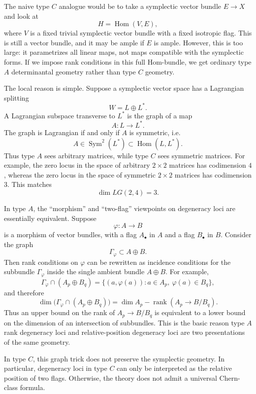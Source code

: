 \documentclass[12pt]{article}
\begin{document}
The naive type $C$ analogue would be to take a symplectic vector bundle $E\to X$ and look at
\[
    H=\operatorname{Hom}(V,E),
\]
where $V$ is a fixed trivial symplectic vector bundle with a fixed isotropic flag. This is still a vector bundle, and it may be ample if $E$ is ample. However, this is too large: it parametrizes all linear maps, not maps compatible with the symplectic forms. If we impose rank conditions in this full Hom-bundle, we get ordinary type $A$ determinantal geometry rather than type $C$ geometry.

The local reason is simple. Suppose a symplectic vector space has a Lagrangian splitting
\[
    W=L\oplus L^*.
\]
A Lagrangian subspace transverse to $L^*$ is the graph of a map
\[
    A:L\to L^*.
\]
The graph is Lagrangian if and only if $A$ is symmetric, i.e.
\[
    A\in \operatorname{Sym}^2(L^*)\subset \operatorname{Hom}(L,L^*).
\]
Thus type $A$ sees arbitrary matrices, while type $C$ sees symmetric matrices. For example, the zero locus in the space of arbitrary $2\times 2$ matrices has codimension $4$, whereas the zero locus in the space of symmetric $2\times 2$ matrices has codimension $3$. This matches
\[
    \dim LG(2,4)=3.
\]
\begin{remark}
    In type $A$, the ``morphism'' and ``two-flag'' viewpoints on degeneracy loci are essentially equivalent. Suppose
    \[
        \varphi:A\to B
    \]
    is a morphism of vector bundles, with a flag $A_\bullet$ in $A$ and a flag $B_\bullet$ in $B$. Consider the graph
    \[
        \Gamma_\varphi\subset A\oplus B.
    \]
    Then rank conditions on $\varphi$ can be rewritten as incidence conditions for the subbundle $\Gamma_\varphi$ inside the single ambient bundle $A\oplus B$. For example,
    \[
        \Gamma_\varphi\cap (A_p\oplus B_q)
        =
        \{(a,\varphi(a)):a\in A_p,
        \ \varphi(a)\in B_q\},
    \]
    and therefore
    \[
        \dim\bigl(\Gamma_\varphi\cap (A_p\oplus B_q)\bigr)
        =
        \dim A_p-
        \operatorname{rank}(A_p\to B/B_q).
    \]
    Thus an upper bound on the rank of $A_p\to B/B_q$ is equivalent to a lower bound on the dimension of an intersection of subbundles. This is the basic reason type $A$ rank degeneracy loci and relative-position degeneracy loci are two presentations of the same geometry.

    In type $C$, this graph trick does not preserve the symplectic geometry. In particular, degeneracy loci in type $C$ can only be interpreted as the relative position of two flags. Otherwise, the theory does not admit a universal Chern-class formula.
\end{remark}
\end{document}
